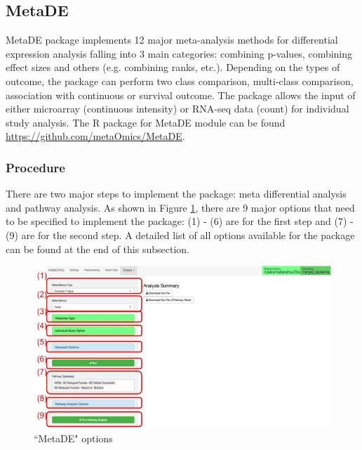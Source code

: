 \subsection{MetaDE}

MetaDE package implements 12 major meta-analysis methods for differential expression analysis falling into 3 main categories: combining p-values, combining effect sizes and others (e.g. combining ranks, etc.). Depending on the types of outcome, the package can perform two class comparison, multi-class comparison, association with continuous or survival outcome. The package allows the input of either microarray (continuous intensity) or RNA-seq data (count) for individual study analysis. 
The R package for MetaDE module can be found \url{https://github.com/metaOmics/MetaDE}.

\subsubsection{Procedure}

There are two major steps to implement the package: meta differential analysis and pathway analysis. As shown in Figure \ref{fig:MetaDEoption}, there are 9 major options that need to be specified to implement the package: (1) - (6) are for the first step and (7) - (9) are for the second step. A detailed list of all options available for the package can be found at the end of this subsection. 

\begin{figure}[H]
\begin{center}
\includegraphics[scale=0.45]{./figure/metaDE/metaDEoption.jpg}
\caption{``MetaDE" options}
\label{fig:MetaDEoption}
\end{center}
\end{figure}

